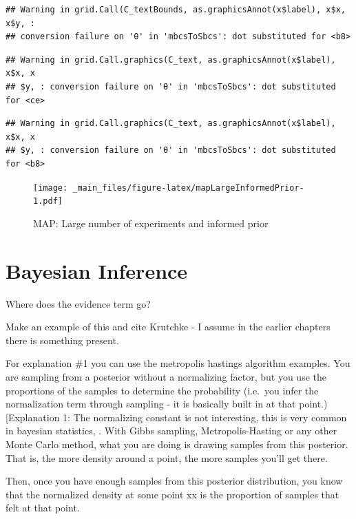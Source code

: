 \documentclass[]{book}
\theoremstyle{definition}
\theoremstyle{definition}
\theoremstyle{definition}
\theoremstyle{remark}
\begin{document}
\begin{verbatim}
## Warning in grid.Call(C_textBounds, as.graphicsAnnot(x$label), x$x, x$y, :
## conversion failure on 'θ' in 'mbcsToSbcs': dot substituted for <b8>
\end{verbatim}

\begin{verbatim}
## Warning in grid.Call.graphics(C_text, as.graphicsAnnot(x$label), x$x, x
## $y, : conversion failure on 'θ' in 'mbcsToSbcs': dot substituted for <ce>
\end{verbatim}

\begin{verbatim}
## Warning in grid.Call.graphics(C_text, as.graphicsAnnot(x$label), x$x, x
## $y, : conversion failure on 'θ' in 'mbcsToSbcs': dot substituted for <b8>
\end{verbatim}

\begin{figure}
\centering
\texttt{[image: \_main\_files/figure-latex/mapLargeInformedPrior-1.pdf]}
\caption{\label{fig:mapLargeInformedPrior}MAP: Large number of experiments
and informed prior}
\end{figure}

\section{Bayesian Inference}\label{bayesian-inference}

Where does the evidence term go?

Make an example of this and cite Krutchke - I assume in the earlier
chapters there is something present.

For explanation \#1 you can use the metropolis hastings algorithm
examples. You are sampling from a posterior without a normalizing
factor, but you use the proportions of the samples to determine the
probability (i.e.~you infer the normalization term through sampling - it
is basically built in at that point.) {[}Explanation 1: The normalizing
constant is not interesting, this is very common in bayesian statistics,
. With Gibbs sampling, Metropolis-Hasting or any other Monte Carlo
method, what you are doing is drawing samples from this posterior. That
is, the more density around a point, the more samples you'll get there.

Then, once you have enough samples from this posterior distribution, you
know that the normalized density at some point xx is the proportion of
samples that felt at that point.
\end{document}
